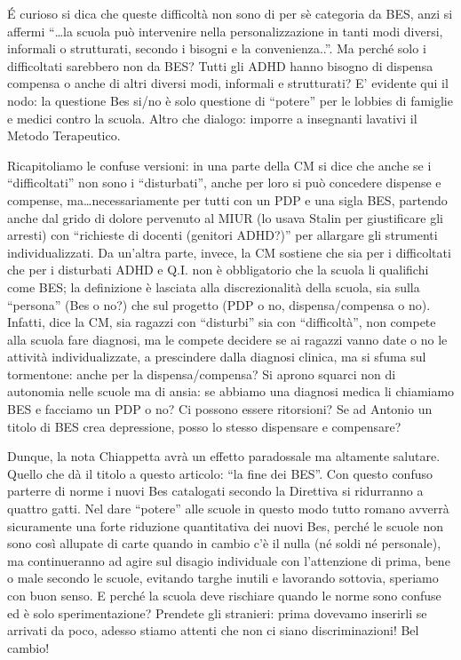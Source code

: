 \'{E} curioso si dica che queste difficoltà non sono di per sè  categoria da BES, anzi si affermi  “…la scuola può intervenire nella personalizzazione in tanti modi diversi, informali o strutturati, secondo i bisogni e la convenienza..”.  Ma perché solo i difficoltati sarebbero  non da BES? Tutti gli ADHD hanno bisogno di dispensa compensa o anche di altri diversi modi, informali e strutturati?
E’ evidente qui il nodo: la questione Bes si/no è solo questione di “potere” per le lobbies di famiglie e medici contro la scuola. Altro che dialogo: imporre a insegnanti lavativi il Metodo Terapeutico.

Ricapitoliamo le confuse versioni: in una parte della CM si dice che anche se i “difficoltati” non sono i “disturbati”, anche per loro si può concedere dispense e compense,  ma…necessariamente per tutti con un PDP e una sigla BES,  partendo anche dal grido di dolore pervenuto al MIUR (lo usava Stalin per giustificare gli arresti) con “richieste di docenti (genitori ADHD?)” per allargare  gli strumenti individualizzati.  Da un'altra parte, invece, la CM sostiene che  sia per i difficoltati che per i disturbati ADHD e Q.I. non è obbligatorio che la scuola li qualifichi come BES; la definizione è lasciata alla discrezionalità della scuola, sia sulla “persona” (Bes o no?) che sul progetto (PDP o no, dispensa/compensa o no).  Infatti, dice la CM,  sia ragazzi con “disturbi” sia  con “difficoltà”,  non compete alla scuola fare diagnosi, ma le compete decidere se ai ragazzi vanno date o no le attività individualizzate, a prescindere dalla diagnosi clinica, ma si sfuma sul tormentone: anche per la dispensa/compensa? Si aprono squarci non di autonomia nelle scuole ma di ansia: se abbiamo una diagnosi medica li chiamiamo  BES e facciamo un PDP o no?  Ci possono essere ritorsioni? Se ad Antonio un titolo di BES crea depressione, posso lo stesso dispensare e compensare?

Dunque, la nota Chiappetta avrà un effetto paradossale ma altamente salutare. Quello che dà il titolo a questo articolo: “la fine dei BES”. Con questo confuso parterre di norme  i nuovi Bes catalogati secondo la Direttiva si ridurranno a quattro gatti. Nel dare “potere” alle scuole in questo modo tutto romano avverrà sicuramente una forte riduzione quantitativa dei nuovi Bes, perché le scuole non sono così allupate di carte quando in cambio  c'è il nulla (né soldi né personale), ma continueranno ad agire sul disagio individuale con l'attenzione di prima, bene o male secondo le scuole, evitando targhe inutili e lavorando sottovia,  speriamo con buon senso. E perché la scuola deve rischiare quando le norme sono confuse ed è solo sperimentazione?  Prendete gli stranieri: prima dovevamo inserirli se arrivati da poco, adesso stiamo attenti che non ci siano discriminazioni! Bel cambio!

